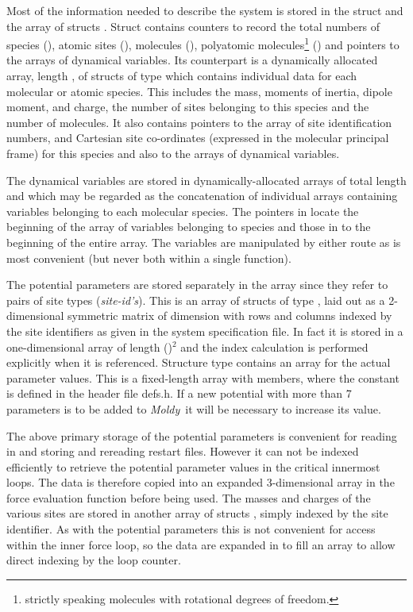 \documentclass[a4paper,twoside]{report}
\newcommand{\Fname}[1]{{\upshape\mdseries\sffamily#1}}
\newcommand{\moldy}{\emph{Moldy}}
\begin{document}
Most of the information needed to describe the system is stored in the
struct  and the array of structs .  Struct
 contains counters to record the total numbers of species
(), atomic sites (), molecules
(), polyatomic molecules\footnote{strictly speaking
  molecules with rotational degrees of freedom.} () and
pointers to the arrays of dynamical variables.  Its counterpart
 is a dynamically allocated array, length
, of structs of type  which
contains individual data for each molecular or atomic species.  This
includes the mass, moments of inertia, dipole moment, and charge, the
number of sites belonging to this species and the number of molecules.
It also contains pointers to the array of site identification numbers,
and Cartesian site co-ordinates (expressed in the molecular principal
frame) for this species and also to the arrays of dynamical variables.

The dynamical variables are stored in dynamically-allocated arrays of
total length  and  which may be regarded as
the concatenation of individual arrays containing variables belonging
to each molecular species. The pointers in 
locate the beginning of the array of variables belonging to species
 and those in  to the beginning of the entire
array.  The variables are manipulated by either route as is most
convenient (but never both within a single function).

The potential parameters are stored separately in the array
 since they refer to pairs of site types
(\emph{site-id's}).  This is an array of structs of type
, laid out as a 2-dimensional symmetric matrix of
dimension  with rows and columns indexed by the
site identifiers as given in the system specification file.  In fact
it is stored in a one-dimensional array of length
()$^2$ and the index calculation is performed
explicitly when it is referenced.  Structure type 
contains an array  for the actual parameter values.  This is
a fixed-length array with  members, where the constant
 is defined in the header file \Fname{defs.h}.  If a new
potential with more than 7 parameters is to be added to \moldy\ it
will be necessary to increase its value.  

The above primary storage of the potential parameters is convenient
for reading in and storing and rereading restart files.  However it
can not be indexed efficiently to retrieve the potential parameter
values in the critical innermost loops.  The data is therefore copied
into an expanded 3-dimensional array
 in the force evaluation function
 before being used.  The masses and charges of the
various sites are stored in another array of structs
, simply indexed by the site identifier. As with the
potential parameters this is not convenient for access within the
inner force loop, so the data are expanded in  to fill
an array  to allow direct indexing by the loop
counter.
\end{document}
